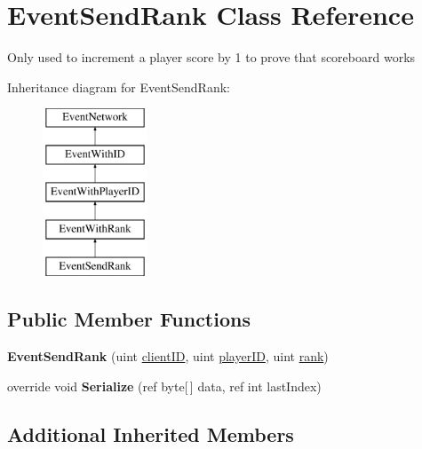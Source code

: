 \hypertarget{class_event_send_rank}{\section{Event\-Send\-Rank Class Reference}
\label{class_event_send_rank}
}


Only used to increment a player score by 1 to prove that scoreboard works  


Inheritance diagram for Event\-Send\-Rank\-:\begin{figure}[H]
\begin{center}
\leavevmode
\includegraphics[height=5.000000cm]{class_event_send_rank}
\end{center}
\end{figure}
\subsection*{Public Member Functions}
\begin{DoxyCompactItemize}
\item 
\hypertarget{class_event_send_rank_adc5770a02941af4875991acc008fa7c9}{{\bfseries Event\-Send\-Rank} (uint \hyperlink{class_event_with_i_d_a4b58cdaef622cb06405b6829a160cef5}{client\-I\-D}, uint \hyperlink{class_event_with_player_i_d_a41340c3a625e17bb56c31cc937db338e}{player\-I\-D}, uint \hyperlink{class_event_with_rank_ab7a5557f1fe949d90945003b566d33db}{rank})}\label{class_event_send_rank_adc5770a02941af4875991acc008fa7c9}

\item 
\hypertarget{class_event_send_rank_a5ad0fe665e253fc7d16323cb9f760815}{override void {\bfseries Serialize} (ref byte\mbox{[}$\,$\mbox{]} data, ref int last\-Index)}\label{class_event_send_rank_a5ad0fe665e253fc7d16323cb9f760815}

\end{DoxyCompactItemize}
\subsection*{Additional Inherited Members}


